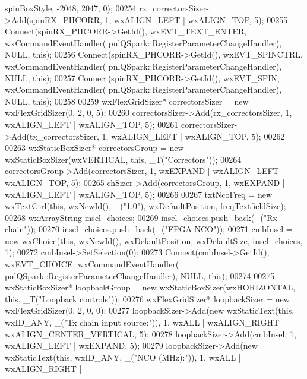 \begin{DoxyCode}
      spinBoxStyle, -2048, 2047, 0);
00254     rx\_correctorsSizer->Add(spinRX_PHCORR, 1, wxALIGN\_LEFT | wxALIGN\_TOP, 5);
00255     Connect(spinRX_PHCORR->GetId(), wxEVT\_TEXT\_ENTER, wxCommandEventHandler(
      pnlQSpark::RegisterParameterChangeHandler), NULL, \textcolor{keyword}{this});
00256     Connect(spinRX_PHCORR->GetId(), wxEVT\_SPINCTRL, wxCommandEventHandler(
      pnlQSpark::RegisterParameterChangeHandler), NULL, \textcolor{keyword}{this});
00257     Connect(spinRX_PHCORR->GetId(), wxEVT\_SPIN, wxCommandEventHandler(
      pnlQSpark::RegisterParameterChangeHandler), NULL, \textcolor{keyword}{this});
00258 
00259     wxFlexGridSizer* correctorsSizer = \textcolor{keyword}{new} wxFlexGridSizer(0, 2, 0, 5);
00260     correctorsSizer->Add(rx\_correctorsSizer, 1, wxALIGN\_LEFT | wxALIGN\_TOP, 5);
00261     correctorsSizer->Add(tx\_correctorsSizer, 1, wxALIGN\_LEFT | wxALIGN\_TOP, 5);
00262 
00263     wxStaticBoxSizer* correctorsGroup = \textcolor{keyword}{new} wxStaticBoxSizer(wxVERTICAL, \textcolor{keyword}{this}, 
      _T(\textcolor{stringliteral}{"Correctors"}));
00264     correctorsGroup->Add(correctorsSizer, 1, wxEXPAND | wxALIGN\_LEFT | wxALIGN\_TOP, 5);
00265     chSizer->Add(correctorsGroup, 1, wxEXPAND | wxALIGN\_LEFT | wxALIGN\_TOP, 5);
00266 
00267     txtNcoFreq = \textcolor{keyword}{new} wxTextCtrl(\textcolor{keyword}{this}, wxNewId(), \_(\textcolor{stringliteral}{"1.0"}), wxDefaultPosition, freqTextfieldSize);
00268     wxArrayString insel\_choices;
00269     insel\_choices.push\_back(\_(\textcolor{stringliteral}{"Rx chain"}));
00270     insel\_choices.push\_back(\_(\textcolor{stringliteral}{"FPGA NCO"}));
00271     cmbInsel = \textcolor{keyword}{new} wxChoice(\textcolor{keyword}{this}, wxNewId(), wxDefaultPosition, wxDefaultSize, insel\_choices, 1);
00272     cmbInsel->SetSelection(0);
00273     Connect(cmbInsel->GetId(), wxEVT\_CHOICE, wxCommandEventHandler(
      pnlQSpark::RegisterParameterChangeHandler), NULL, \textcolor{keyword}{this});
00274 
00275     wxStaticBoxSizer* loopbackGroup = \textcolor{keyword}{new} wxStaticBoxSizer(wxHORIZONTAL, \textcolor{keyword}{this}, 
      _T(\textcolor{stringliteral}{"Loopback controls"}));
00276     wxFlexGridSizer* loopbackSizer = \textcolor{keyword}{new} wxFlexGridSizer(0, 2, 0, 0);
00277     loopbackSizer->Add(\textcolor{keyword}{new} wxStaticText(\textcolor{keyword}{this}, wxID\_ANY, \_(\textcolor{stringliteral}{"Tx chain input source:"})), 1, wxALL | 
      wxALIGN\_RIGHT | wxALIGN\_CENTER\_VERTICAL, 5);
00278     loopbackSizer->Add(cmbInsel, 1, wxALIGN\_LEFT | wxEXPAND, 5);
00279     loopbackSizer->Add(\textcolor{keyword}{new} wxStaticText(\textcolor{keyword}{this}, wxID\_ANY, \_(\textcolor{stringliteral}{"NCO (MHz):"})), 1, wxALL | wxALIGN\_RIGHT | 

\end{DoxyCode}
